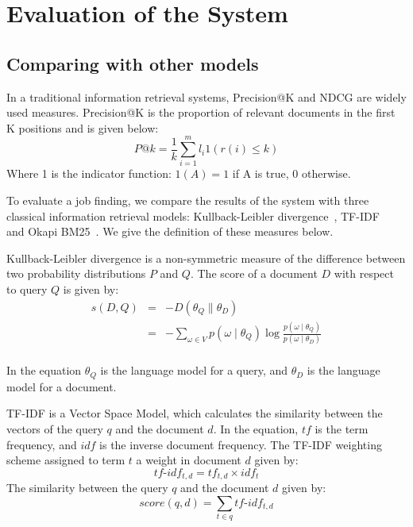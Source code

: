 \section{Evaluation of the System}
\label{sec1}

\subsection{Comparing with other models}

In a traditional information retrieval systems, Precision@K and NDCG are widely used measures.
Precision@K is the proportion of relevant documents in the first K positions and is given below:
$$ P@k = \frac{1}{k} \sum^m_{i=1} l_i 1 \left(  r(i) \leq k  \right )  $$
Where 1 is the indicator function: $1(A) = 1$ if A is true, 0 otherwise.

To evaluate a job finding, we compare the results of the system with three classical information retrieval models: Kullback-Leibler divergence~\cite{zhai2008statistical},  TF-IDF~\cite{manning2008introduction} and Okapi BM25~\cite{robertson1995okapi}. We give the definition of these measures below.

Kullback-Leibler divergence is a non-symmetric measure of the difference between two probability distributions $P$ and $Q$. The score of a document $D$ with respect to query $Q$ is given by:
\begin{equation}
    \begin{array}{rcl}
        s(D,Q) & = & -D( \theta_Q \parallel  \theta_D )\\
               & = &- \sum_{ \omega \in V } p (\omega \mid \theta_Q) \log \frac{ p (\omega \mid \theta_Q )}{p(\omega \mid \theta_D)} \\

    \end{array}
\end{equation}

In the equation $\theta_Q$ is the language model for a query, and  $\theta_D$ is the language model for a document.

TF-IDF is a Vector Space Model, which calculates the similarity between the vectors of the query $q$ and the document $d$. In the equation, $tf$ is the term frequency, and $idf$ is the inverse document frequency. The TF-IDF weighting scheme assigned to term $t$ a weight in document $d$ given by:
$$ tf\text{-}idf_{t,d} = tf_{t,d} \times idf_{t} $$
The similarity between the query $q$ and the document $d$ given by:
$$ score(q,d) =  \sum_{t \in q }  tf\text{-}idf_{t,d} $$

